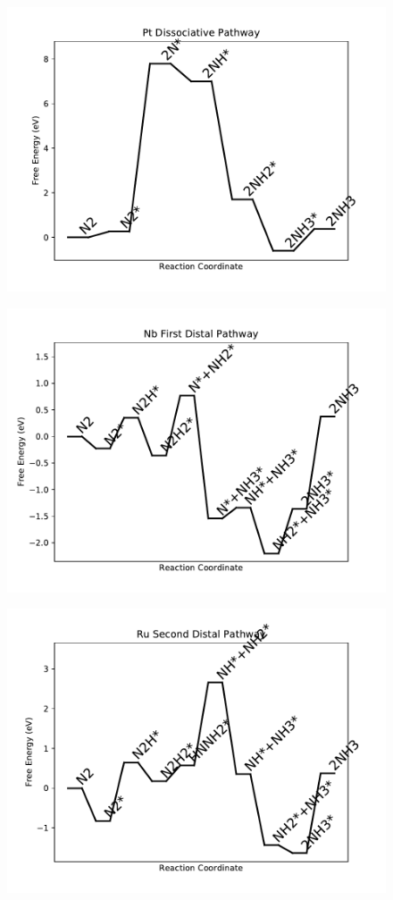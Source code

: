 \begin{figure}
\centering
\includegraphics[width=0.8\linewidth]{data/plots/Pt_dissociative.pdf}
\end{figure}

\begin{figure}
\centering
\includegraphics[width=0.8\linewidth]{data/plots/Nb_distal_1.pdf}
\end{figure}

\begin{figure}
\centering
\includegraphics[width=0.8\linewidth]{data/plots/Ru_distal_2.pdf}
\end{figure}

